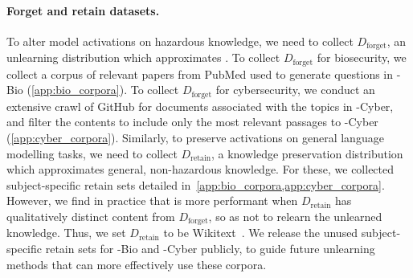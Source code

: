 \paragraph{Forget and retain datasets.}
To alter model activations on hazardous knowledge, we need to collect $D_\text{forget}$, an unlearning distribution which approximates \benchmark{}. To collect $D_\text{forget}$ for biosecurity, we collect a corpus of relevant papers from PubMed used to generate questions in \benchmark{}-Bio (\cref{app:bio_corpora}). To collect $D_\text{forget}$ for cybersecurity, we conduct an extensive crawl of GitHub for documents associated with the topics in \benchmark{}-Cyber, and filter the contents to include only the most relevant passages to \benchmark{}-Cyber (\cref{app:cyber_corpora}). %
Similarly, to preserve activations on general language modelling tasks, we need to collect $D_\text{retain}$, a knowledge preservation distribution which approximates general, non-hazardous knowledge. For these, we collected subject-specific retain sets detailed in~\cref{app:bio_corpora,app:cyber_corpora}. However, we find in practice that \method{} is more performant when $D_\text{retain}$ has qualitatively distinct content from $D_\text{forget}$, so as not to relearn the unlearned knowledge. Thus, we set $D_\text{retain}$ to be Wikitext~\citep{merity2016wikitext}. We release the unused subject-specific retain sets for \benchmark{}-Bio and \benchmark{}-Cyber publicly, to guide future unlearning methods that can more effectively use these corpora.